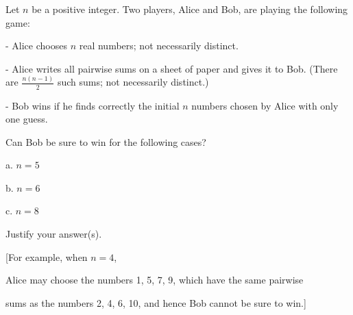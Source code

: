 Let $n$ be a positive integer. Two players, Alice and Bob, are playing the following game:

- Alice chooses $n$ real numbers; not necessarily distinct.

- Alice writes all pairwise sums on a sheet of paper and gives it to Bob. (There are $\frac{n(n-1)}{2}$ such sums; not necessarily distinct.)

- Bob wins if he finds correctly the initial $n$ numbers chosen by Alice with only one guess.

Can Bob be sure to win for the following cases?

a. $n=5$

b. $n=6$

c. $n=8$

Justify your answer(s).

[For example, when $n=4$,

 Alice may choose the numbers 1, 5, 7, 9, which have the same pairwise 

sums as the numbers 2, 4, 6, 10, and hence Bob cannot be sure to win.]